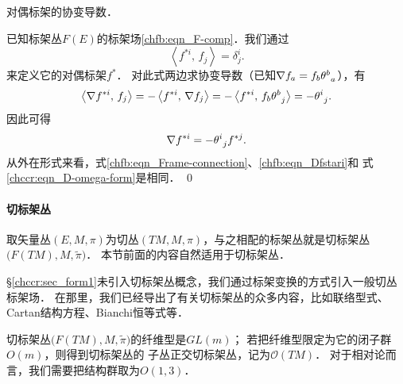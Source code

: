 
\begin{example}
    对偶标架的协变导数．
\end{example}
已知标架丛$F(E)$的标架场\eqref{chfb:eqn_F-comp}．我们通过
\begin{equation}
    \left< f^{*i} ,\, f_j\right> =\delta^i_j .
\end{equation}
来定义它的对偶标架$f^{*}$．
对此式两边求协变导数（已知$\nabla f_a  =f_b \theta_{\hphantom{a}a}^{b}$），有
\begin{equation}
    \left< \nabla f^{*i} ,\, f_j\right> = - \left< f^{*i} ,\, \nabla f_j\right>
    =- \left< f^{*i} ,\, f_b \theta_{\hphantom{a}j}^{b} \right>
    =- \theta_{\hphantom{j}j}^{i}.
\end{equation} 
因此可得
\begin{equation}\label{chfb:eqn_Dfstari}
    \nabla f^{*i}=- \theta_{\hphantom{j}j}^{i} f^{*j} .
\end{equation}
从外在形式来看，式\eqref{chfb:eqn_Frame-connection}、\eqref{chfb:eqn_Dfstari}和
式\eqref{chccr:eqn_D-omega-form}是相同．
\qed







\paragraph{切标架丛}\label{chfb:sec_tangent-frame-bundles}
取矢量丛$(E,M,\pi)$为切丛$(TM,M,\pi)$，与之相配的标架丛就是切标架丛$\bigl(F(TM),M,\tilde{\pi}\bigr)$．
本节前面的内容自然适用于切标架丛．



\S\ref{chccr:sec_form1}未引入切标架丛概念，我们通过标架变换的方式引入一般切丛标架场．
在那里，我们已经导出了有关切标架丛的众多内容，比如联络型式、Cartan结构方程、Bianchi恒等式等．

切标架丛$\bigl(F(TM),M,\tilde{\pi}\bigr)$的纤维型是$GL(m)$；
若把纤维型限定为它的闭子群$O(m)$，则得到切标架丛的
子丛{\heiti 正交切标架丛}，记为$\mathcal{O}(TM)$．
对于相对论而言，我们需要把结构群取为$O(1,3)$．





